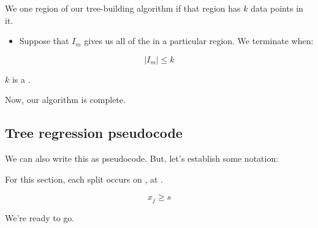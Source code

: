         \begin{definition}
            We  one region of our tree-building algorithm if that region has  $k$ data points in it.

            \begin{itemize}
                \item Suppose that $I_m$ gives us all of the  in a particular region. We terminate when:  
            \end{itemize}

            \begin{equation*}
                \big| I_m \big| \leq k
            \end{equation*}

            $k$ is a .
        \end{definition}

        Now, our algorithm is complete. 

        


    \pagebreak

    \subsection{Tree regression pseudocode}

        We can also write this as pseudocode. But, let's establish some notation:\\

        \begin{notation}
            For this section, each split occurs on , at .

            \begin{equation*}
                x_j \geq s
            \end{equation*}
        \end{notation}

        We're ready to go.

